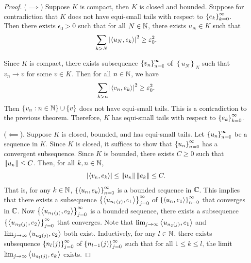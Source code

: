 \documentclass[a4paper]{article}
\begin{document}
\begin{proof}
($\implies$) Suppose $K$ is compact, then $K$ is closed and 
bounded. Suppose for contradiction that $K$ does not have 
equi-small tails with respect to $\left\{ e_k \right\}_{k=0}^\infty$. Then 
there exists $\epsilon_0 > 0$ such that for all 
$N \in \mathbb{N}$, there exists $u_N \in K$ such that 
\[
\sum_{k > N} \left\lvert \left\langle u_N, e_k \right\rangle\right\rvert^2 \geq \varepsilon_0^2.
\]

Since $K$ is compact, there exists subsequence $\left\{ v_n \right\}_{n=0}^\infty$
of $\left\{ u_N \right\}_N$ such that $v_n \to v$ for some 
$v \in K$. Then for all $n \in \mathbb{N}$, we have 
\[
\sum_{k > n} \left\lvert \left\langle v_n, e_k \right\rangle\right\rvert^2 \geq \varepsilon_0^2.
\]
Then $\left\{ v_n : n \in \mathbb{N} \right\} \cup \left\{ v \right\}$ 
does not have equi-small tails. This is a contradiction to the previous 
theorem. Therefore, $K$ has equi-small tails with respect 
to $\left\{ e_k \right\}_{k=0}^\infty$.

($\impliedby$). Suppose $K$ is closed, bounded, and has equi-small
tails. Let $\left\{ u_n \right\}_{n=0}^\infty$ be a sequence in $K$. Since $K$ 
is closed, it suffices to show that $\left\{ u_n \right\}_{n=0}^\infty$ has a 
convergent subsequence. Since $K$ is bounded, 
there exists $C \geq 0$ such that $\left\lVert u_n\right\rVert \leq C$. 
Then, for all $k, n \in \mathbb{N}$, 
\[
  \left\lvert \left\langle v_n, e_k \right\rangle\right\rvert \leq \left\lVert u_n\right\rVert \left\lVert e_k\right\rVert \leq C.
\]
That is, for any $k \in \mathbb{N}$, $\left\{ \left\langle u_n, e_k \right\rangle \right\}_{n=0}^\infty$ 
is a bounded sequence in $\mathbb{C}$. This implies that 
there exists a subsequence $\left\{ \left\langle u_{n_1(j)}, e_1 \right\rangle \right\}_{j=0}^\infty$ 
of $\left\{ \left\langle u_n, e_1 \right\rangle \right\}_{n=0}^\infty$ that converges in $\mathbb{C}$. 
Now $\left\{ \left\langle u_{n_1(j)}, e_2 \right\rangle \right\}_{j=0}^\infty$ is a bounded sequence, 
there exists a subsequence $\left\{ \left\langle u_{n_2(j)}, e_2 \right\rangle \right\}_{j=0}^\infty$
that converges. Note that 
$\lim_{j \to \infty} \left\langle u_{n_2(j)}, e_1 \right\rangle$ 
and $\lim_{j \to \infty} \left\langle u_{n_2(j)}, e_2 \right\rangle$ 
both exist. Inductively, for any $l \in \mathbb{N}$, there 
exists subsequence $\left\{ n_l(j) \right\}_{j=0}^\infty$ of $\left\{ n_{l-1}(j) \right\}_{j=0}^\infty$
such that for all $1 \leq k \leq l$, the limit
$\lim_{j \to \infty} \left\langle u_{n_l(j)}, e_k \right\rangle$ exists.


\end{proof}
\end{document}
